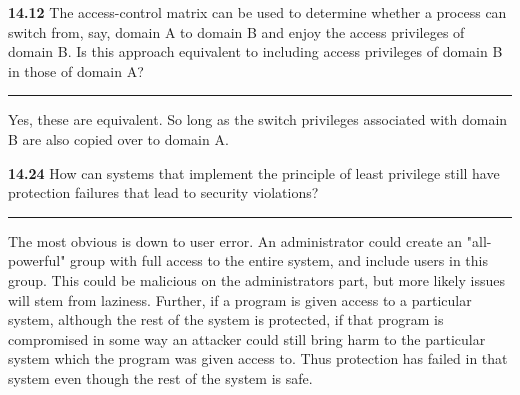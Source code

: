 \documentclass[12pt]{jhwhw}
\begin{document}
\bigbreak
\textbf{14.12}  
	The access-control matrix can be used to determine whether a process can switch from, say, domain
	A to domain B and enjoy the access privileges of domain B. Is this approach equivalent to
	including access privileges of domain B in those of domain A?
\textcolor[RGB]{240,240,240}{\rule{\textwidth}{0.5pt}}\bigbreak

	\begin{addmargin}[1em]{}
		Yes, these are equivalent. So long as the switch privileges associated with domain B
		are also copied over to domain A.
	\end{addmargin}

\bigbreak
\textbf{14.24}
	How can systems that implement the principle of least privilege still have protection
	failures that lead to security violations?
\textcolor[RGB]{240,240,240}{\rule{\textwidth}{0.5pt}}\bigbreak

	\begin{addmargin}[1em]{}
		The most obvious is down to user error. An administrator could create an "all-powerful" group
		with full access to the entire system, and include users in this group. This could be malicious
		on the administrators part, but more likely issues will stem from laziness.
		\bigbreak
		Further, if a program is given access to a particular system, although the rest of the system is
		protected, if that program is compromised in some way an attacker could still bring harm
		to the particular system which the program was given access to. Thus protection has failed in
		that system even though the rest of the system is safe.
	\end{addmargin}
\end{document}
